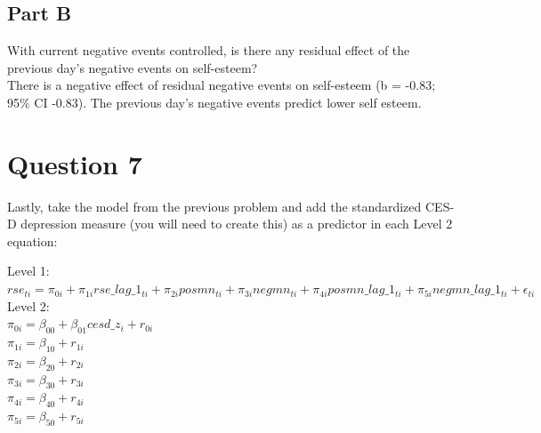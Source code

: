 \documentclass[]{article}
\begin{document}
\subsection{Part B}\label{part-b-4}

With current negative events controlled, is there any residual effect of
the previous day's negative events on self-esteem?\\
There is a negative effect of residual negative events on self-esteem (b
= -0.83; 95\% CI -0.83). The previous day's negative events predict
lower self esteem.

\section{Question 7}\label{question-7}

Lastly, take the model from the previous problem and add the
standardized CES-D depression measure (you will need to create this) as
a predictor in each Level 2 equation:

Level 1:\\
\(rse_{ti} = \pi_{0i} + \pi_{1i}rse\_lag\_1_{ti} + \pi_{2i}posmn_{ti} + \pi_{3i}negmn_{ti} + \pi_{4i}posmn\_lag\_1_{ti} + \pi_{5i}negmn\_lag\_1_{ti} + \epsilon_{ti}\)\\
Level 2:\\
\(\pi_{0i} = \beta_{00} + \beta_{01}cesd\_z_i + r_{0i}\)\\
\(\pi_{1i} = \beta_{10} + r_{1i}\)\\
\(\pi_{2i} = \beta_{20} + r_{2i}\)\\
\(\pi_{3i} = \beta_{30} + r_{3i}\)\\
\(\pi_{4i} = \beta_{40} + r_{4i}\)\\
\(\pi_{5i} = \beta_{50} + r_{5i}\)
\end{document}
